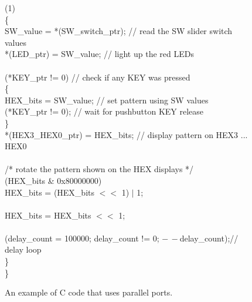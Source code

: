 \begin{figure}[h!]
\begin{center}
\begin{minipage}[t]{12.5 cm}
\begin{tabbing}
 (1)\\
\>\{\\
\>\>SW\_value = *(SW\_switch\_ptr); \>\>// read the SW slider switch values\\
\>\>*(LED\_ptr) = SW\_value; \>\>// light up the red LEDs\\
~\\
\> (*KEY\_ptr != 0) \>\>// check if any KEY was pressed\\
\>\>\{\\
\>\>\>HEX\_bits = SW\_value; \>// set pattern using SW values\\
\>\> (*KEY\_ptr != 0); \>// wait for pushbutton KEY release\\
\>\>\}\\
\>\>*(HEX3\_HEX0\_ptr) = HEX\_bits; \>\>// display pattern on HEX3 ... HEX0\\
~\\
\>\>/* rotate the pattern shown on the HEX displays */\\
\> (HEX\_bits \& 0x80000000)\\
\>\>\>HEX\_bits = (HEX\_bits $<<$ 1) $\mid$ 1;\\
\>\\
\>\>\>HEX\_bits = HEX\_bits $<<$ 1;\\
~\\
\> (delay\_count = 100000; delay\_count != 0; $-\,-$delay\_count);\hspace{.75
cm}// delay loop\\
\>\} \\
\}\\
\end{tabbing}
\end{minipage}
\end{center}
	\vspace{-0.33in}\caption{An example of C code that uses parallel ports.}
   \label{fig:getting_started_C}
\end{figure}

